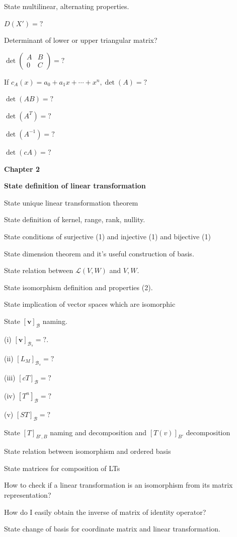 \documentclass[10pt,landscape]{article}
\begin{document}
\begin{multicols}{4}
State multilinear, alternating properties.

$D(X') = ?$

Determinant of lower or upper triangular matrix?

$
\operatorname{det} 
\begin{pmatrix}
A & B \\
0 & C 
\end{pmatrix} = ?
$

If $c_A(x) = a_0 + a_1x + \cdots + x^n, \det(A) = ?$

$\det(AB) = ?$

$\det(A^T) = ?$

$\det(A^{-1}) = ?$

$\det(cA) = ?$

\textbf{Chapter 2}

\textbf{State definition of linear transformation}

State unique linear transformation theorem

State definition of kernel, range, rank, nullity.

State conditions of surjective (1) and injective (1) and bijective (1)

State dimension theorem and it's useful construction of basis.

State relation between $\mathcal{L}(V, W)$ and $V, W$.

State isomorphism definition and properties (2).

State implication of vector spaces which are isomorphic

State $[\mathbf{v}]_{\mathcal{B}}$ naming.

(i) $[\mathbf{v}]_{\mathcal{B}_s} = ?$.

(ii) $[L_M]_{\mathcal{B}_s} = ?$

(iii) $[cT]_{\mathcal{B}} = ?$

(iv) $[T^n]_{\mathcal{B}} = ?$

(v) $[ST]_{\mathcal{B}} = ?$

State $[T]_{B', B}$ naming and decomposition and $[T(v)]_{B'}$ decomposition

State relation between isomorphism and ordered basis

State matrices for composition of LTs

How to check if a linear transformation is an isomorphism from its matrix representation?

How do I easily obtain the inverse of matrix of identity operator?

State change of basis for coordinate matrix and linear transformation.


\end{multicols}
\end{document}
